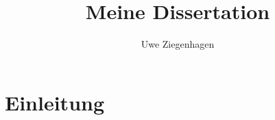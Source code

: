 \documentclass[12pt,ngerman]{scrbook}
\title{Meine Dissertation}
\author{Uwe Ziegenhagen}
\begin{document}
\maketitle

\tableofcontents

\listoffigures

\listoftables


\chapter{Einleitung}

\blindtext[10]
\end{document}
